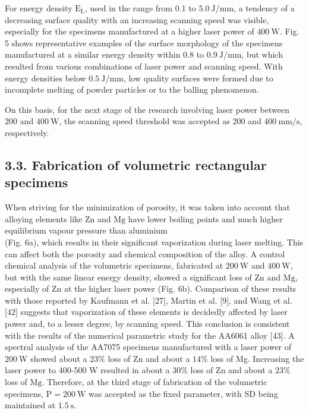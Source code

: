 \documentclass[10pt]{article}
\begin{document}
For energy density $\mathrm{E}_{\mathrm{L}}$, used in the range from 0.1 to $5.0 \mathrm{~J} / \mathrm{mm}$, a tendency of a decreasing surface quality with an increasing scanning speed was visible, especially for the specimens manufactured at a higher laser power of $400 \mathrm{~W}$. Fig. 5 shows representative examples of the surface morphology of the specimens manufactured at a similar energy density within 0.8 to $0.9 \mathrm{~J} / \mathrm{mm}$, but which resulted from various combinations of laser power and scanning speed. With energy densities below $0.5 \mathrm{~J} / \mathrm{mm}$, low quality surfaces were formed due to incomplete melting of powder particles or to the balling phenomenon.

On this basis, for the next stage of the research involving laser power between 200 and $400 \mathrm{~W}$, the scanning speed threshold was accepted as 200 and $400 \mathrm{~mm} / \mathrm{s}$, respectively.

\subsection*{3.3. Fabrication of volumetric rectangular specimens}
When striving for the minimization of porosity, it was taken into account that alloying elements like $\mathrm{Zn}$ and $\mathrm{Mg}$ have lower boiling points and much higher equilibrium vapour pressure than aluminium\\
(Fig. 6a), which results in their significant vaporization during laser melting. This can affect both the porosity and chemical composition of the alloy. A control chemical analysis of the volumetric specimens, fabricated at $200 \mathrm{~W}$ and $400 \mathrm{~W}$, but with the same linear energy density, showed a significant loss of $\mathrm{Zn}$ and $\mathrm{Mg}$, especially of $\mathrm{Zn}$ at the higher laser power (Fig. 6b). Comparison of these results with those reported by Kaufmann et al. [27], Martin et al. [9], and Wang et al. [42] suggests that vaporization of these elements is decidedly affected by laser power and, to a lesser degree, by scanning speed. This conclusion is consistent with the results of the numerical parametric study for the AA6061 alloy [43]. A spectral analysis of the AA7075 specimens manufactured with a laser power of $200 \mathrm{~W}$ showed about a $23 \%$ loss of $\mathrm{Zn}$ and about a $14 \%$ loss of Mg. Increasing the laser power to 400-500 W resulted in about a $30 \%$ loss of $\mathrm{Zn}$ and about a $23 \%$ loss of $\mathrm{Mg}$. Therefore, at the third stage of fabrication of the volumetric specimens, $\mathrm{P}=200 \mathrm{~W}$ was accepted as the fixed parameter, with SD being maintained at $1.5 \mathrm{~s}$.
\end{document}
